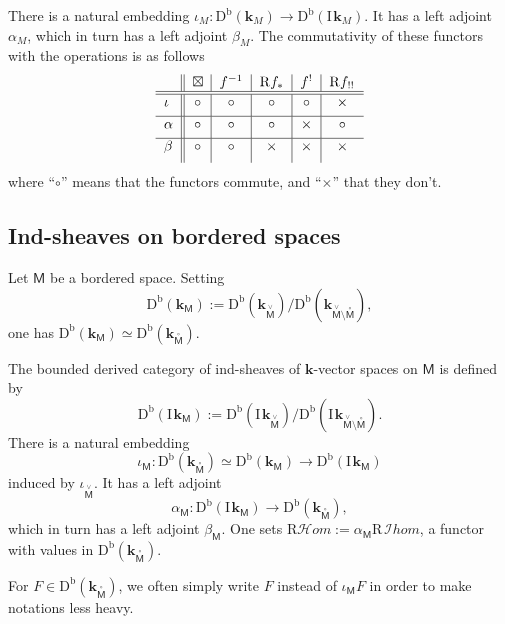 \documentclass[11pt]{article}
\numberwithin{equation}{section}
\let\mathcal\mathscr
\let\cl\colon
\newcommand{\accentset}[2]{\overset{#1}{#2}}
\theoremstyle{plain}
\theoremstyle{definition}
\newcommand{\derived}[1]{\mathrm{#1}}
\newcommand{\derd}{\derived{D}}
\newcommand{\derr}{\derived{R}}
\newcommand{\BDC}{\derd^{\mathrm{b}}}
\newcommand{\roim}[1]{\derr#1_*}
\newcommand{\reeim}[1]{\derr#1_{\mspace{1mu}!!}\mspace{1mu}}
\newcommand{\rhom}{{\derr\sheaffont{H}\!om}}
\newcommand{\rihom}{{\derr\mspace{2mu}\shi\!hom}}
\newcommand{\etens}[1][]{\mathbin{\boxtimes_{\raise1.5ex\hbox to-.1em{}#1}}}
\newcommand{\sheaffont}[1]{\mathcal{#1}}
\newcommand\shi{\sheaffont{I}}
\newcommand{\field}{\mathbf{k}}\let\cor\field
\newcommand{\ind}{\mathrm{I}\mspace{2mu}}
\newcommand{\ifield}{\ind\field}
\newcommand{\bclose}[1]{{\accentset{\vee}{#1}}}\let\cc\bclose
\newcommand{\unbordered}[1]{{\accentset{\circ}{#1}}}
\newcommand{\bbM}{\mathsf{M}}
\newcommand{\obM}{\unbordered{\bbM}}
\newcommand{\cbM}{\bclose{\bbM}}
\newcommand{\defeq}{\mathbin{:=}}\let \seteq\defeq
\begin{document}
There is a natural embedding $\iota_M\colon\BDC(\field_M)\to\BDC(\ifield_M)$. It has a left adjoint $\alpha_M$, which in turn has a left adjoint $\beta_M$.
The commutativity of these functors with the operations is as follows
\begin{equation}\label{eq:table}
\begin{tabular}{l||c|c|c|c|c}
{} & $\etens$ & $f^{-1}$ & $\roim f$ & $f^!$ & $\reeim f$ \\ \hline \hline
$\underset{}{\iota}$ & $\circ$ & $\circ$ & $\circ$ & $\circ$ & $\times$ \\ \hline
$\underset{}{\alpha}$ & $\circ$ & $\circ$ & $\circ$ & $\times$ & $\circ$ \\ \hline
$\underset{}{\beta}$ & $\circ$ & $\circ$ & $\times$ & $\times$ & $\times$
\end{tabular}
\end{equation}
where ``$\circ$'' means that the functors commute,
and ``$\times$'' that they don't.

\subsection{Ind-sheaves on bordered spaces}

Let $\bbM$ be a bordered space. Setting
\[
\BDC(\field_\bbM)\defeq \BDC(\field_\cbM)/\BDC(\field_{\cbM\setminus\obM}),
\]
one has $\BDC(\field_\bbM)\simeq\BDC(\field_\obM)$.

The bounded derived category of ind-sheaves of $\field$-vector spaces on $\bbM$ is defined by
\[
\BDC(\ifield_\bbM)\defeq \BDC(\ifield_\cbM)/\BDC(\ifield_{\cbM\setminus\obM}).
\]
There is a natural embedding \[\iota_\bbM\colon\BDC(\field_\obM)\simeq\BDC(\field_\bbM)\to\BDC(\ifield_\bbM)\] induced by $\iota_\cbM$. It has a left adjoint
\[\alpha_\bbM\cl \BDC(\ifield_\bbM)\to \BDC(\field_\obM),\]
which in turn has a left adjoint $\beta_\bbM$.
One sets
$\rhom\defeq\alpha_\bbM\rihom$, a functor with values in $\BDC(\field_\obM)$.

For $F\in \BDC(\field_\obM)$,
we often simply write $F$ instead of $\iota_\bbM F$
in order to make notations less heavy.
\end{document}
